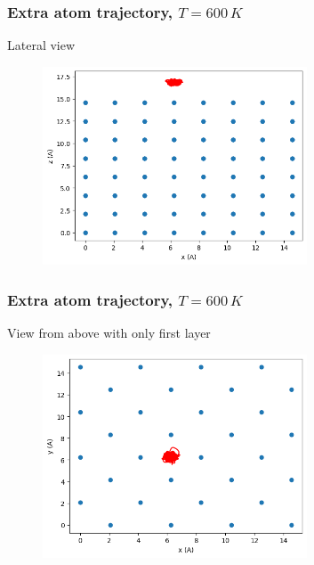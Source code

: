 \documentclass{beamer}
\begin{document}
\begin{frame}
    \frametitle{Extra atom trajectory, $T=600\,K$}

    \centering Lateral view
    \begin{figure}
        \includegraphics[width=0.7\textwidth]{images/extra600klateral.png}
    \end{figure}

\end{frame}

\begin{frame}
    \frametitle{Extra atom trajectory, $T=600\,K$}

    \centering View from above with only first layer
    \begin{figure}
        \includegraphics[width=0.7\textwidth]{images/extra600kabove.png}
    \end{figure}

\end{frame}
\end{document}
